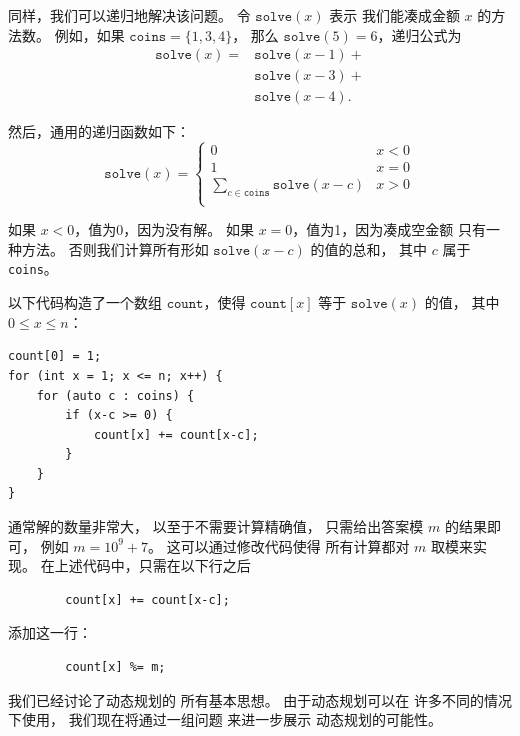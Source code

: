 同样，我们可以递归地解决该问题。
令 $\texttt{solve}(x)$ 表示
我们能凑成金额 $x$ 的方法数。
例如，如果 $\texttt{coins}=\{1,3,4\}$，
那么 $\texttt{solve}(5)=6$，递归公式为
\begin{equation*}
\begin{split}
\texttt{solve}(x) = & \texttt{solve}(x-1) + \\
                    & \texttt{solve}(x-3) + \\
                    & \texttt{solve}(x-4)  .
\end{split}
\end{equation*}

然后，通用的递归函数如下：
\begin{equation*}
    \texttt{solve}(x) = \begin{cases}
               0               & x < 0\\
               1               & x = 0\\
               \sum_{c \in \texttt{coins}} \texttt{solve}(x-c) & x > 0 \\
           \end{cases}
\end{equation*}

如果 $x<0$，值为0，因为没有解。
如果 $x=0$，值为1，因为凑成空金额
只有一种方法。
否则我们计算所有形如
$\texttt{solve}(x-c)$ 的值的总和，
其中 $c$ 属于 \texttt{coins}。

以下代码构造了一个数组
$\texttt{count}$，使得
$\texttt{count}[x]$ 等于
$\texttt{solve}(x)$ 的值，
其中 $0 \le x \le n$：

\begin{lstlisting}
count[0] = 1;
for (int x = 1; x <= n; x++) {
    for (auto c : coins) {
        if (x-c >= 0) {
            count[x] += count[x-c];
        }
    }
}
\end{lstlisting}

通常解的数量非常大，
以至于不需要计算精确值，
只需给出答案模 $m$ 的结果即可，
例如 $m=10^9+7$。
这可以通过修改代码使得
所有计算都对 $m$ 取模来实现。
在上述代码中，只需在以下行之后
\begin{lstlisting}
        count[x] += count[x-c];
\end{lstlisting}
添加这一行：
\begin{lstlisting}
        count[x] %= m;
\end{lstlisting}

我们已经讨论了动态规划的
所有基本思想。
由于动态规划可以在
许多不同的情况下使用，
我们现在将通过一组问题
来进一步展示
动态规划的可能性。

